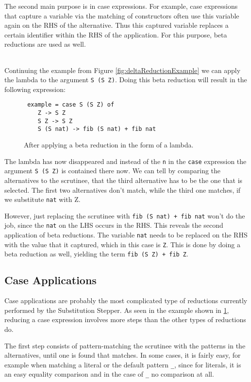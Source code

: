 The second main purpose is in case expressions.
For example, case expressions that capture a variable via the matching of constructors often use this variable again on the RHS of the alternative.
Thus this captured variable replaces a certain identifier within the RHS of the application.
For this purpose, beta reductions are used as well.

\ \\
Continuing the example from Figure \ref*{fig:deltaReductionExample} we can apply the lambda to the argument \texttt{S (S Z)}.
Doing this beta reduction will result in the following expression:

\begin{figure}[!ht]
\begin{verbatim}
 example = case S (S Z) of
    Z -> S Z
    S Z -> S Z
    S (S nat) -> fib (S nat) + fib nat
\end{verbatim}
    \caption{After applying a beta reduction in the form of a lambda.}
    \label{fig:betaReductionExample1}
\end{figure}

The lambda has now disappeared and instead of the \texttt{n} in the \texttt{case} expression the argument \texttt{S (S Z)} is contained there now.
We can tell by comparing the alternatives to the scrutinee,
that the third alternative has to be the one that is selected.
The first two alternatives don't match, while the third one matches, if we substitute \texttt{nat} with Z.

However, just replacing the scrutinee with \texttt{fib (S nat) + fib nat} won't do the job,
since the \texttt{nat} on the LHS occurs in the RHS.
This reveals the second application of beta reductions.
The variable \texttt{nat} needs to be replaced on the RHS with the value that it captured,
which in this case is \texttt{Z}.
This is done by doing a beta reduction as well,
yielding the term \texttt{fib (S Z) + fib Z}.

\subsection{Case Applications}
Case applications are probably the most complicated type of reductions currently performed by the Substitution Stepper.
As seen in the example shown in \ref*{fig:betaReductionExample1},
reducing a case expression involves more steps than the other types of reductions do.

The first step consists of pattern-matching the scrutinee with the patterns in the alternatives,
until one is found that matches.
In some cases, it is fairly easy,
for example when matching a literal or the default pattern \texttt{\_},
since for literals,
it is an easy equality comparison and in the case of \texttt{\_} no comparison at all.

